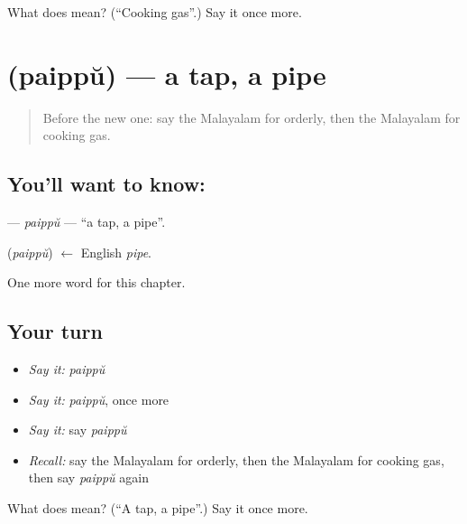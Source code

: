 \begin{tcolorbox}[breakable,colback=teal!4,colframe=teal!35!black,title={Before you move on}]
What does  mean? (\textquotedblleft{}Cooking gas\textquotedblright{}.) Say it once more.
\end{tcolorbox}
\section[\texorpdfstring{\ml{പൈപ്പ്} (paippŭ)}{പൈപ്പ് (paippŭ)}]{ (paippŭ) — a tap, a pipe}

\label{lesson:ML-C248-paippu}



\begin{quote}
Before the new one: say the Malayalam for orderly, then the Malayalam for cooking gas.
\end{quote}

\subsection*{You'll want to know: }
\textbf{} — \emph{paippŭ} — \textquotedblleft{}a tap, a pipe\textquotedblright{}.

\begin{cousinweb}
\textbf{} (\emph{paippŭ}) $\leftarrow$ English \emph{pipe}.
\end{cousinweb}

\begin{grammarlens}[title={What you've built}]
One more word for this chapter.
\end{grammarlens}

\subsection*{Your turn}
\begin{itemize}
\raggedright
  \item \emph{Say it:} \emph{paippŭ}
  \item \emph{Say it:} \emph{paippŭ}, once more
  \item \emph{Say it:} say \emph{paippŭ}
  \item \emph{Recall:} say the Malayalam for orderly, then the Malayalam for cooking gas, then say \emph{paippŭ} again
\end{itemize}

\begin{tcolorbox}[breakable,colback=teal!4,colframe=teal!35!black,title={Before you move on}]
What does  mean? (\textquotedblleft{}A tap, a pipe\textquotedblright{}.) Say it once more.
\end{tcolorbox}
